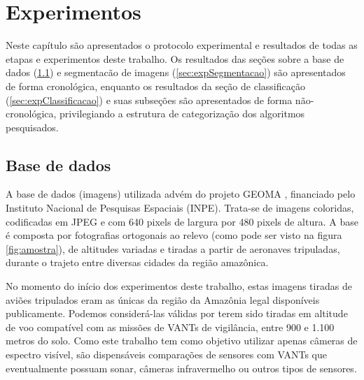 \chapter{Experimentos}\label{cap:experimentos}

Neste capítulo são apresentados o protocolo experimental e resultados de todas as etapas e experimentos deste trabalho. Os resultados das seções sobre a base de dados (\ref{sec:expBase}) e segmentacão de imagens (\ref{sec:expSegmentacao}) são apresentados de forma cronológica, enquanto os resultados da seção de classificação (\ref{sec:expClassificacao}) e suas subseções são apresentados de forma não-cronológica, privilegiando a estrutura de categorização dos algoritmos pesquisados.

\section{Base de dados}\label{sec:expBase}

A base de dados (imagens) utilizada advém do projeto GEOMA \cite{geoma}, financiado pelo Instituto Nacional de Pesquisas Espaciais (INPE). Trata-se de imagens coloridas, codificadas em JPEG e com 640 pixels de largura por 480 pixels de altura. A base é composta por fotografias ortogonais ao relevo (como pode ser visto na figura \ref{fig:amostra}), de altitudes variadas e tiradas a partir de aeronaves tripuladas, durante o trajeto entre diversas cidades da região amazônica.

No momento do início dos experimentos deste trabalho, estas imagens tiradas de aviões tripulados eram as únicas da região da Amazônia legal disponíveis publicamente. Podemos considerá-las válidas por terem sido tiradas em altitude de voo compatível com as missões de VANTs de vigilância, entre 900 e 1.100 metros do solo. Como este trabalho tem como objetivo utilizar apenas câmeras de espectro visível, são dispensáveis comparações de sensores com VANTs que eventualmente possuam sonar, câmeras infravermelho ou outros tipos de sensores.

